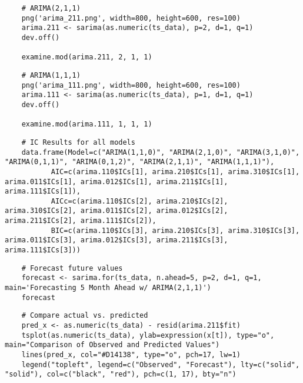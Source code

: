 \begin{lstlisting}
    # ARIMA(2,1,1)
    png('arima_211.png', width=800, height=600, res=100)
    arima.211 <- sarima(as.numeric(ts_data), p=2, d=1, q=1)
    dev.off()
    
    examine.mod(arima.211, 2, 1, 1)
\end{lstlisting}

\begin{lstlisting}
    # ARIMA(1,1,1)
    png('arima_111.png', width=800, height=600, res=100)
    arima.111 <- sarima(as.numeric(ts_data), p=1, d=1, q=1)
    dev.off()
    
    examine.mod(arima.111, 1, 1, 1)
\end{lstlisting}

\begin{lstlisting}
    # IC Results for all models
    data.frame(Model=c("ARIMA(1,1,0)", "ARIMA(2,1,0)", "ARIMA(3,1,0)", "ARIMA(0,1,1)", "ARIMA(0,1,2)", "ARIMA(2,1,1)", "ARIMA(1,1,1)"), 
           AIC=c(arima.110$ICs[1], arima.210$ICs[1], arima.310$ICs[1], arima.011$ICs[1], arima.012$ICs[1], arima.211$ICs[1], arima.111$ICs[1]),
           AICc=c(arima.110$ICs[2], arima.210$ICs[2], arima.310$ICs[2], arima.011$ICs[2], arima.012$ICs[2], arima.211$ICs[2], arima.111$ICs[2]),
           BIC=c(arima.110$ICs[3], arima.210$ICs[3], arima.310$ICs[3], arima.011$ICs[3], arima.012$ICs[3], arima.211$ICs[3], arima.111$ICs[3]))
\end{lstlisting}

\begin{lstlisting}
    # Forecast future values
    forecast <- sarima.for(ts_data, n.ahead=5, p=2, d=1, q=1, main='Forecasting 5 Month Ahead w/ ARIMA(2,1,1)')
    forecast
\end{lstlisting}

\begin{lstlisting}
    # Compare actual vs. predicted
    pred_x <- as.numeric(ts_data) - resid(arima.211$fit)
    tsplot(as.numeric(ts_data), ylab=expression(x[t]), type="o", main="Comparison of Observed and Predicted Values")
    lines(pred_x, col="#D14138", type="o", pch=17, lw=1) 
    legend("topleft", legend=c("Observed", "Forecast"), lty=c("solid", "solid"), col=c("black", "red"), pch=c(1, 17), bty="n")
\end{lstlisting}
